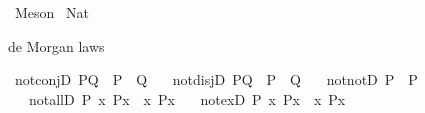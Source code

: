%
\begin{isabellebody}%
%
%
\isadelimdocument
%
\endisadelimdocument
%
\isatagdocument
%
\isamarkuptrue%
%
\endisatagdocument
{\isafolddocument}%
%
\isadelimdocument
%
\endisadelimdocument
%
\isadelimtheory
%
\endisadelimtheory
%
\isatagtheory
{}\isamarkupfalse%
\ Meson\isanewline
{}\ Nat\isanewline
{}%
\endisatagtheory
{\isafoldtheory}%
%
\isadelimtheory
%
\endisadelimtheory
%
\isadelimdocument
%
\endisadelimdocument
%
\isatagdocument
%
\isamarkuptrue%
%
\endisatagdocument
{\isafolddocument}%
%
\isadelimdocument
%
\endisadelimdocument
%
\begin{isamarkuptext}%
de Morgan laws%
\end{isamarkuptext}\isamarkuptrue%
\isamarkupfalse%
\ not{\isacharunderscore}{\kern0pt}conjD{\isacharcolon}{\kern0pt}\ {\isachardoublequoteopen}{\isasymnot}{\isacharparenleft}{\kern0pt}P{\isasymand}Q{\isacharparenright}{\kern0pt}\ {\isasymLongrightarrow}\ {\isasymnot}P\ {\isasymor}\ {\isasymnot}Q{\isachardoublequoteclose}\isanewline
\ \ \ not{\isacharunderscore}{\kern0pt}disjD{\isacharcolon}{\kern0pt}\ {\isachardoublequoteopen}{\isasymnot}{\isacharparenleft}{\kern0pt}P{\isasymor}Q{\isacharparenright}{\kern0pt}\ {\isasymLongrightarrow}\ {\isasymnot}P\ {\isasymand}\ {\isasymnot}Q{\isachardoublequoteclose}\isanewline
\ \ \ not{\isacharunderscore}{\kern0pt}notD{\isacharcolon}{\kern0pt}\ {\isachardoublequoteopen}{\isasymnot}{\isasymnot}P\ {\isasymLongrightarrow}\ P{\isachardoublequoteclose}\isanewline
\ \ \ not{\isacharunderscore}{\kern0pt}allD{\isacharcolon}{\kern0pt}\ {\isachardoublequoteopen}{\isasymAnd}P{\isachardot}{\kern0pt}\ {\isasymnot}{\isacharparenleft}{\kern0pt}{\isasymforall}x{\isachardot}{\kern0pt}\ P{\isacharparenleft}{\kern0pt}x{\isacharparenright}{\kern0pt}{\isacharparenright}{\kern0pt}\ {\isasymLongrightarrow}\ {\isasymexists}x{\isachardot}{\kern0pt}\ {\isasymnot}P{\isacharparenleft}{\kern0pt}x{\isacharparenright}{\kern0pt}{\isachardoublequoteclose}\isanewline
\ \ \ not{\isacharunderscore}{\kern0pt}exD{\isacharcolon}{\kern0pt}\ {\isachardoublequoteopen}{\isasymAnd}P{\isachardot}{\kern0pt}\ {\isasymnot}{\isacharparenleft}{\kern0pt}{\isasymexists}x{\isachardot}{\kern0pt}\ P{\isacharparenleft}{\kern0pt}x{\isacharparenright}{\kern0pt}{\isacharparenright}{\kern0pt}\ {\isasymLongrightarrow}\ {\isasymforall}x{\isachardot}{\kern0pt}\ {\isasymnot}P{\isacharparenleft}{\kern0pt}x{\isacharparenright}{\kern0pt}{\isachardoublequoteclose}\isanewline

\end{isabellebody}
